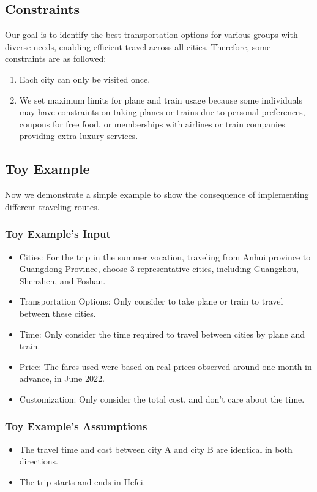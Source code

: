 \documentclass{article}
\begin{document}
\subsection{Constraints}

Our goal is to identify the best transportation options for various groups with
diverse needs, enabling efficient travel across all cities. Therefore, some
constraints are as followed:

\begin{enumerate}
  \item Each city can only be visited once.
  \item We set maximum limits for plane and train usage because some individuals may
        have constraints on taking planes or trains due to personal preferences,
        coupons for free food, or memberships with airlines or train companies
        providing extra luxury services.
\end{enumerate}

\subsection{Toy Example}

Now we demonstrate a simple example to show the consequence of implementing
different traveling routes.

\subsubsection{Toy Example's Input}
\begin{itemize}
  \item Cities: For the trip in the summer vocation, traveling from Anhui province to
        Guangdong Province, choose 3 representative cities, including Guangzhou,
        Shenzhen, and Foshan.
  \item Transportation Options: Only consider to take plane or train to travel between
        these cities.
  \item Time: Only consider the time required to travel between cities by plane and
        train.
  \item Price: The fares used were based on real prices observed around one month in
        advance, in June 2022.
  \item Customization: Only consider the total cost, and don't care about the time.
\end{itemize}

\subsubsection{Toy Example's Assumptions}
\begin{itemize}
  \item The travel time and cost between city A and city B are identical in both
        directions.
  \item The trip starts and ends in Hefei.
\end{itemize}
\end{document}
